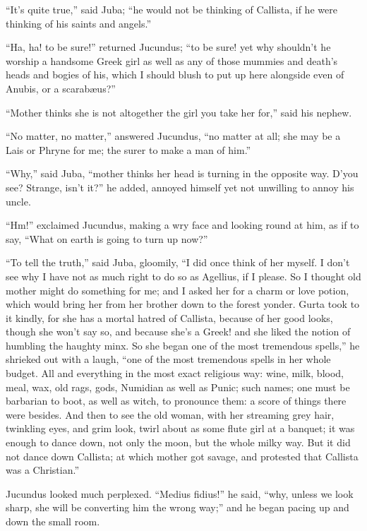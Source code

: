 ``It's quite true,'' said Juba; ``he would not be
thinking of Callista, if he were thinking of his saints and
angels.''

``Ha, ha! to be sure!'' returned Jucundus; ``to be sure! yet why shouldn't he worship a handsome Greek girl as well as
any of those mummies and death's heads and bogies of his, which I
should blush to put up here alongside even of Anubis, or a scarabæus?''

``Mother thinks she is not altogether the girl you take her
for,'' said his nephew.

``No matter, no matter,'' answered Jucundus, ``no
matter at all; she may be a Lais or Phryne for me; the surer to make a
man of him.''

``Why,'' said Juba, ``mother thinks her head is turning
in the opposite way. D'you see? Strange, isn't it?'' he added,
annoyed himself yet not unwilling to annoy his uncle.

``Hm!'' exclaimed Jucundus, making a wry face and looking
round at him, as if to say, ``What on earth is going to turn up
now?''

``To tell the truth,'' said Juba, gloomily, ``I did
once think of her myself. I don't see why I have not as much right to
do so as Agellius, if I please. So I thought old mother might do
something for me; and I asked her for a charm or love potion, which
would bring her from her brother down to the forest yonder. Gurta took
to it kindly, for she has a mortal hatred of Callista, because of her
good looks, though she won't say so, and because she's a Greek! and
she liked the notion of humbling the haughty minx. So she began one of
the most tremendous spells,'' he shrieked out with a laugh,
``one of the most tremendous spells in her whole budget. All and
everything in the most exact religious way: wine, milk, blood, meal,
wax, old rags, gods, Numidian as well as Punic; such names; one
must be barbarian to boot, as well as witch, to pronounce them: a
score of things there were besides. And then to see the old woman,
with her streaming grey hair, twinkling eyes, and grim look, twirl
about as some flute girl at a banquet; it was enough to dance down,
not only the moon, but the whole milky way. But it did not dance down
Callista; at which mother got savage, and protested that Callista was
a Christian.''

Jucundus looked much perplexed. ``Medius fidius!'' he said,
``why, unless we look sharp, she will be converting him the wrong
way;'' and he began pacing up and down the small room.

